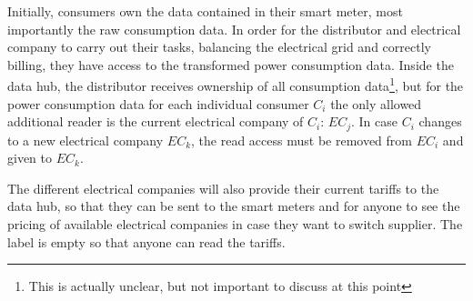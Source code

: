Initially, consumers own the data contained in their smart meter, most importantly the raw consumption data.
In order for the distributor and electrical company to carry out their tasks, balancing the electrical grid and correctly billing, they have access to the transformed power consumption data.
Inside the data hub, the distributor receives ownership of all consumption data\footnote{This is actually unclear, but not important to discuss at this point}, but for the power consumption data for each individual consumer $C_i$ the only allowed additional reader is the current electrical company of $C_i$: $EC_j$.
In case $C_i$ changes to a new electrical company $EC_k$, the read access must be removed from $EC_i$ and given to $EC_k$.

The different electrical companies will also provide their current tariffs to the data hub, so that they can be sent to the smart meters and for anyone to see the pricing of available electrical companies in case they want to switch supplier.
The label is empty so that anyone can read the tariffs.
